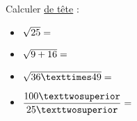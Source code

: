 \documentclass{automatisme}
\begin{document}
\begin{frame}
	Calculer \uline{de tête} :
	\begin{itemize}
		\setlength{\itemsep}{1em}
		\item $\sqrt{25} = \correction{5}$
		\item $\sqrt{9 + 16} = \correction{\sqrt{25} = 5}$
		\item $\sqrt{36 × 49} = \correction{\sqrt{36} × \sqrt{49} = 6 × 7 = 42}$
		\item $\dfrac{100²}{25²} = \correction{(\dfrac{100}{25})² = 4² = 16}$
	\end{itemize}
\end{frame}
\end{document}
